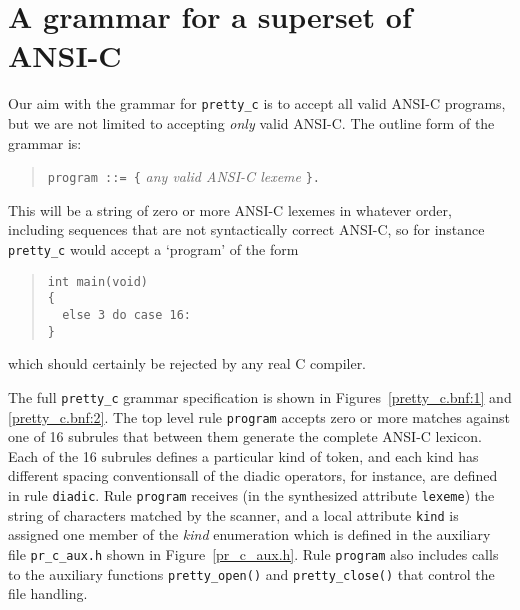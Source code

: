 \section{A grammar for a superset of ANSI-C}
Our aim with the grammar for \verb+pretty_c+ is to accept all valid ANSI-C programs, but
we are not limited to accepting {\em only} valid ANSI-C.
The outline form of the grammar is:
\begin{quote}
{\tt program ::= \{} {\em any valid ANSI-C lexeme} {\tt \}.}
\end{quote}

This will be a string of zero or more ANSI-C lexemes in whatever order, including 
sequences that are not syntactically correct ANSI-C, so for instance
\verb+pretty_c+ would accept a `program' of the form 
\begin{quote}
\small
\begin{verbatim}
int main(void)
{
  else 3 do case 16:
}
\end{verbatim}
\end{quote}
which should certainly be rejected by any real C compiler.

The full \verb+pretty_c+ grammar specification is shown in Figures~\ref{pretty_c.bnf:1} and
\ref{pretty_c.bnf:2}.
The top level rule {\tt program} accepts zero or more matches against one of 16 subrules
that between them generate the complete ANSI-C lexicon. Each of the 16 subrules defines a
particular kind of token, and each kind has different spacing conventions\dash all of the diadic
operators, for instance, are defined in rule {\tt diadic}. Rule {\tt program} receives (in
the synthesized attribute {\tt lexeme}) the string of characters matched by the scanner, and a local
attribute {\tt kind} is assigned one member of the {\em kind} enumeration which is defined in the
auxiliary file \verb+pr_c_aux.h+ shown in Figure~\ref{pr_c_aux.h}. Rule {\tt program} also
includes calls to the auxiliary functions \verb+pretty_open()+ and \verb+pretty_close()+ that
control the file handling.


